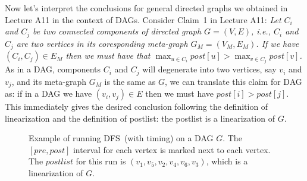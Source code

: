Now let's interpret the conclusions for general directed graphs we obtained in  Lecture A11 in the context of DAGs.
Consider Claim~1 in Lecture A11: \emph{Let $C_i$ and $C_j$ be two connected components of directed graph $G = (V, E)$, i.e., $C_i$ and $C_j$ are two
vertices in its coresponding meta-graph $G_M = (V_M, E_M)$. If we have $(C_i, C_j) \in E_M$ then
we must have that $\max_{u\in C_i} post[u] > \max_{v\in C_j} post[v]$.}
As in a DAG, components $C_i$ and $C_j$ will degenerate into two vertices, say $v_i$ and $v_j$, and
its meta-graph $G_M$ is the same as $G$, we can translate this claim for DAG as: 
if in a DAG we have $(v_i, v_j) \in E$ then we must have $post[i] > post[j]$.
This immediately gives the desired conclusion following the definition of linearization
and the definition of postlist: the postlist is a linearization of $G$.

\begin{figure}[h!]
\centering{}
\caption{Example of running DFS~(with timing) on a DAG $G$. The $[pre,post]$ interval for each vertex
is marked next to each vertex. The $postlist$ for this run is $(v_1, v_5, v_2, v_4, v_6, v_3)$, which is a linearization of $G$.}
\end{figure}


